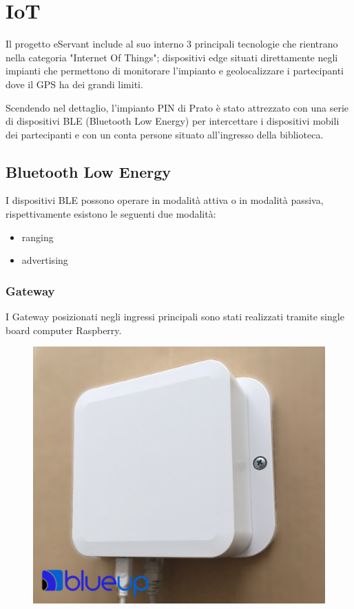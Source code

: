 \chapter{IoT}
Il progetto eServant include al suo interno 3 principali tecnologie che rientrano nella categoria
"Internet Of Things"; dispositivi edge situati direttamente negli impianti che permettono di monitorare
l'impianto e geolocalizzare i partecipanti dove il GPS ha dei grandi limiti.

Scendendo nel dettaglio, l'impianto PIN di Prato è stato attrezzato con una serie di dispositivi BLE 
(Bluetooth Low Energy) per intercettare i dispositivi mobili dei partecipanti e con un conta persone
situato all'ingresso della biblioteca.

\section{Bluetooth Low Energy}
I dispositivi BLE possono operare in modalità attiva o in modalità passiva, rispettivamente esistono
le seguenti due modalità:
\begin{itemize}
    \item ranging
    \item advertising
\end{itemize}


\subsection{Gateway}
I Gateway posizionati negli ingressi principali sono stati realizzati tramite single board computer 
Raspberry.
\begin{figure}[H]
    \centering  
    \includegraphics[scale=0.4]{img/cap4/gateway}
\end{figure}

